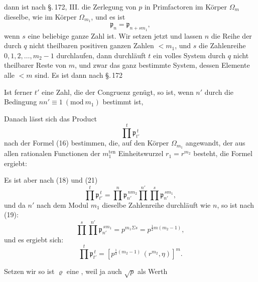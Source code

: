 dann ist nach \S.\,172, III. die Zerlegung von $p$ in Primfactoren im Körper $\Omega_m$ dieselbe, wie im Körper $\Omega_{m_1}$, und es ist
\[
\mathfrak{p}_n = \mathfrak{p}_{n+sm_1},
\]
wenn $s$ eine beliebige ganze Zahl ist. Wir setzen jetzt
und lassen $n$ die Reihe der durch $q$ nicht theilbaren positiven ganzen Zahlen $<m_1$, und $s$ die Zahlenreihe $0,1,2,\ldots,m_2-1$ durchlaufen, dann durchläuft $t$ ein volles System durch $q$ nicht theilbarer Reste von $m$, und zwar das ganz bestimmte System, dessen Elemente alle $<m$ sind. Es ist dann nach \S.\,172

Ist ferner $t'$ eine Zahl, die der Congruenz
genügt, so ist, wenn $n'$ durch die Bedingung $n n' \equiv 1\ (\mathrm{mod}\ m_1)$ bestimmt ist,

Danach lässt sich das Product
\[
\prod^{t} \mathfrak{p}_{t'}^{\,t}
\]
nach der Formel (16) bestimmen, die, auf den Körper $\Omega_{m_1}$ angewandt, der aus allen rationalen Functionen der $m_1^{\mathrm{ten}}$ Einheitswurzel $r_1 = r^{m_2}$ besteht, die Formel ergiebt:

Es ist aber nach (18) und (21)
\[
\prod^{t} \mathfrak{p}_{t'}^{\,t} = \prod^{n} \mathfrak{p}_{n'}^{\,n m_2} \prod^{n'}\prod^{s} \mathfrak{p}_{n'}^{\,s m_1},
\]
und da $n'$ nach dem Modul $m_1$ dieselbe Zahlenreihe durchläuft wie $n$, so ist nach (19):
\[
\prod^{s}\prod^{n'} \mathfrak{p}_{n'}^{\,s m_1} = p^{m_1 \Sigma s} = p^{\frac{1}{2}m(m_2-1)},
\]
und es ergiebt sich:
\[
\prod^{t} \mathfrak{p}_{t'}^{\,t} = \left[p^{\frac{1}{2}(m_2-1)}\,(r^{m_2},\eta)\right]^m.
\]

Setzen wir
so ist $\varrho$ eine , weil ja auch $\sqrt{p}$ als Werth
